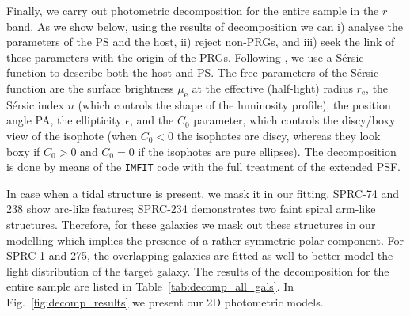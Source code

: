 \documentclass{raa}
\begin{document}
Finally, we carry out photometric decomposition for the entire sample in the $r$ band. As we show below, using the results of decomposition we can i) analyse the parameters of the PS and the host, ii) reject non-PRGs, and iii) seek the link of these parameters with the origin of the PRGs. Following \citet{rc2015}, we use a S\'ersic function \citep{1963BAAA....6...41S,1968adga.book.....S} to describe both the host and PS.
The free parameters of the S\'ersic function are the surface brightness $\mu_\mathrm{e}$ at the effective (half-light) radius $r_\mathrm{e}$, the S\'ersic index $n$ (which controls the shape of the luminosity profile), the position angle PA, the ellipticity $\epsilon$, and the $C_0$ parameter, which controls the discy/boxy view of the isophote (when $C_0<0$ the isophotes are discy, whereas they look boxy if $C_0>0$ and $C_0=0$ if the isophotes are pure ellipses). The decomposition is done by means of the {\tt{IMFIT}} code \citep{2015ApJ...799..226E} with the full treatment of the extended PSF.

In case when a tidal structure is present, we mask it in our fitting. SPRC-74 and 238 show arc-like features; SPRC-234 demonstrates two faint spiral arm-like structures. Therefore, for these galaxies we mask out these structures in our modelling which implies the presence of a rather symmetric polar component. For SPRC-1 and 275, the overlapping galaxies are fitted as well to better model the light distribution of the target galaxy.
The results of the decomposition for the entire sample are listed in Table~\ref{tab:decomp_all_gals}. In Fig.~\ref{fig:decomp_results} we present our 2D photometric models.
\end{document}
